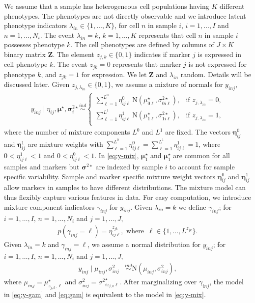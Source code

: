\documentclass[12pt,]{article}
\newcommand{\N}{ \mathcal{N} }
\newcommand{\ind}{\overset{ind}{\sim}}
\def\bet{\bm{\eta}}
\def\N{\text{N}}
\def\Z{\bm{Z}}
\def\bmu{\bm{\mu}}
\def\bsig{\bm{\sigma}}
\begin{document}
We assume that a sample has heterogeneous cell populations having $K$ different phenotypes.  The phenotypes are not directly observable and we introduce latent phenotype indicators \(\lambda_{in} \in \{1, \ldots, K\}\), for cell $n$ in sample $i$, \(i=1, \ldots, I\) and \(n=1, \ldots, N_i\).
The event $\lambda_{in}=k$, $k=1, \ldots, K$ represents that cell $n$ in sample $i$ possesses phenotype $k$.  The cell phenotypes are defined by columns of \(J \times K\) binary matrix \(\Z\). The element \(z_{j, k} \in \{0, 1\}\) indicates if marker \(j\) is expressed in cell phenotype \(k\). The event \(z_{jk}=0\) represents that marker \(j\) is not expressed for phenotype $k$, and \(z_{jk}=1\) for
expression. We let $\Z$ and $\lambda_{in}$ random. Details will be discussed later.  Given \(z_{j, \lambda_{in}} \in \{0, 1\}\), we assume a mixture of
normals for \(y_{inj}\),
\begin{align}
y_{inj} \mid \eta_{ij}, \bmu^\star, \bsig^{2 \star}_{i} \ind
\begin{cases}
\sum_{\ell=1}^{L^0} \eta^0_{ij\ell}~ \N(\mu^\star_{0\ell}, \sigma^{2 \star}_{0i\ell}), &\mbox{if $z_{j,\lambda_{in}}=0$},\\
\sum_{\ell=1}^{L^1} \eta^1_{ij\ell}~ \N(\mu^\star_{1\ell}, \sigma^{2 \star}_{1i\ell}), &\mbox{if $z_{j,\lambda_{in}}=1$},\\
\end{cases} \label{eq:y-mix}
\end{align}
where the number of mixture components \(L^0\) and \(L^1\) are fixed.  The vectors $\bet^0_{ij}$ and $\bet^1_{ij}$ are mixture weights with \(\sum_{\ell=1}^{L^0} \eta^0_{ij\ell}=\sum_{\ell=1}^{L^1}\eta^1_{ij\ell}=1\), where \(0 < \eta^1_{ij\ell} < 1\) and \(0 < \eta^0_{ij\ell} < 1\).  In \eqref{eq:y-mix}, $\bmu^\star_1$ and $\bmu^\star_1$ are common for all samples and markers but $\bsig^{2\star}$ are indexed by sample $i$ to account for sample specific variability.  Sample and marker specific mixture weight vectors $\bet^0_{ij}$ and $\bet^1_{ij}$ allow markers in samples to have different distributions.   The mixture model can thus flexibly capture various features in data.  For easy computation, we introduce mixture component indicators $\gamma_{inj}$ for $y_{inj}$.  Given \(\lambda_{in}=k\) we define
\(\gamma_{inj}\); for \(i=1, \ldots, I\), \(n=1, \ldots, N_i\) and
\(j=1, \ldots, J\),
\begin{eqnarray}
p(\gamma_{inj} = \ell)=\eta^{z_{jk}}_{ij\ell}, \mbox{ where }~ \ell \in \{1,\ldots, L^{z_{jk}}\}. \label{eq:gam}
\end{eqnarray}
Given \(\lambda_{in}=k\) and \(\gamma_{inj}=\ell\), we assume a normal
distribution for \(y_{inj}\); for \(i=1, \ldots, I\),
\(n=1, \ldots, N_i\) and \(j=1, \ldots, J\),
\begin{align}
  y_{inj} \mid \mu_{inj}, \sigma^2_{inj}  &\ind \N(\mu_{inj}, \sigma^2_{inj}), \label{eq:y-gam}
\end{align}
where \(\mu_{inj} = \mu^\star_{z_{j,k},\ell}\) and \(\sigma^2_{inj} =
{\sigma^{2}}^\star_{iz_{j,k}\ell}\). After marginalizing over $\gamma_{inj}$,
the model in \eqref{eq:y-gam} and \eqref{eq:gam} is equivalent to the model in
\eqref{eq:y-mix}.  
\end{document}
